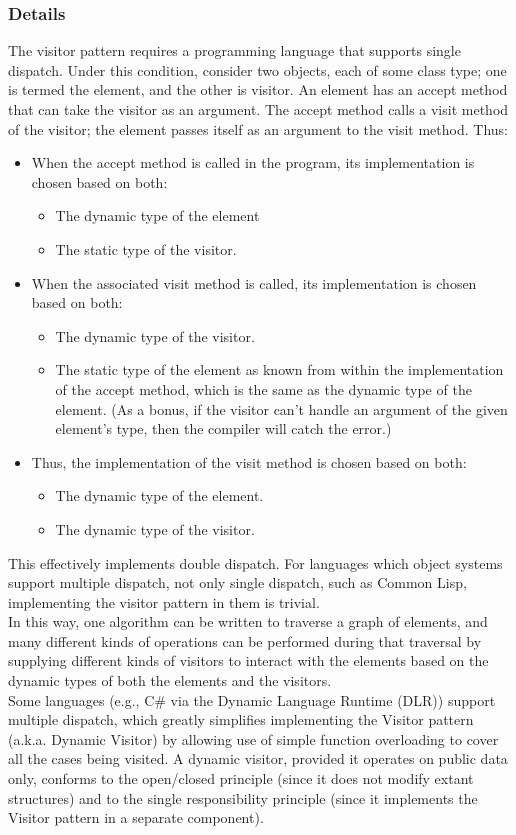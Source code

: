 \subsubsection{Details}
The visitor pattern requires a programming language that supports single dispatch. Under this condition, consider two objects, each of some class type; one is termed the element, and the other is visitor. An element has an accept method that can take the visitor as an argument. The accept method calls a visit method of the visitor; the element passes itself as an argument to the visit method. Thus:\\
\begin{itemize}
	\item When the accept method is called in the program, its implementation is chosen based on both:
	\begin{itemize}
		\item The dynamic type of the element
		\item The static type of the visitor.
	\end{itemize}
	\item When the associated visit method is called, its implementation is chosen based on both:
	\begin{itemize}
		\item The dynamic type of the visitor.
		\item The static type of the element as known from within the implementation of the accept method, which is the same as the dynamic type of the element. (As a bonus, if the visitor can't handle an argument of the given element's type, then the compiler will catch the error.)
	\end{itemize}
	\item Thus, the implementation of the visit method is chosen based on both:
	\begin{itemize}
		\item The dynamic type of the element.
		\item The dynamic type of the visitor.
	\end{itemize}
\end{itemize}
This effectively implements double dispatch. For languages which object systems support multiple dispatch, not only single dispatch, such as Common Lisp, implementing the visitor pattern in them is trivial.\\
In this way, one algorithm can be written to traverse a graph of elements, and many different kinds of operations can be performed during that traversal by supplying different kinds of visitors to interact with the elements based on the dynamic types of both the elements and the visitors.\\
Some languages (e.g., C\# via the Dynamic Language Runtime (DLR)) support multiple dispatch, which greatly simplifies implementing the Visitor pattern (a.k.a. Dynamic Visitor) by allowing use of simple function overloading to cover all the cases being visited. A dynamic visitor, provided it operates on public data only, conforms to the open/closed principle (since it does not modify extant structures) and to the single responsibility principle (since it implements the Visitor pattern in a separate component).
